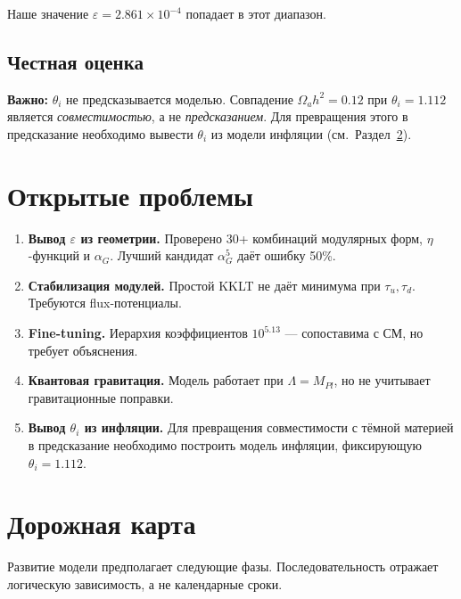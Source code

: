 \documentclass[12pt,a4paper]{article}
\numberwithin{equation}{section}
\begin{document}
Наше значение $\varepsilon = 2.861\times 10^{-4}$ попадает 
в этот диапазон.

\subsection{Честная оценка}

\textbf{Важно:} $\theta_i$ не предсказывается моделью. 
Совпадение $\Omega_a h^2 = 0.12$ при $\theta_i = 1.112$ 
является \emph{совместимостью}, а не \emph{предсказанием}. 
Для превращения этого в предсказание необходимо вывести 
$\theta_i$ из модели инфляции (см.~Раздел~\ref{sec:roadmap}).

\section{Открытые проблемы}
\label{sec:open}

\begin{enumerate}[leftmargin=1.5em]
\item \textbf{Вывод $\varepsilon$ из геометрии.} Проверено 30+ 
комбинаций модулярных форм, $\eta$-функций и $\alpha_G$. 
Лучший кандидат $\alpha_G^5$ даёт ошибку 50\%.
\item \textbf{Стабилизация модулей.} Простой KKLT не даёт 
минимума при $\tau_u, \tau_d$. Требуются flux-потенциалы.
\item \textbf{Fine-tuning.} Иерархия коэффициентов $10^{5.13}$ --- 
сопоставима с СМ, но требует объяснения.
\item \textbf{Квантовая гравитация.} Модель работает при 
$\Lambda = M_{Pl}$, но не учитывает гравитационные поправки.
\item \textbf{Вывод $\theta_i$ из инфляции.} Для превращения 
совместимости с тёмной материей в предсказание необходимо 
построить модель инфляции, фиксирующую $\theta_i = 1.112$.
\end{enumerate}

\section{Дорожная карта}
\label{sec:roadmap}

Развитие модели предполагает следующие фазы. 
Последовательность отражает логическую зависимость, 
а не календарные сроки.
\end{document}
